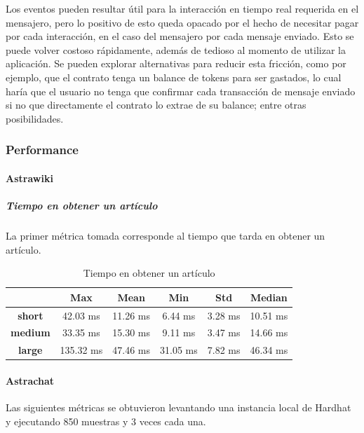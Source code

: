 Los eventos pueden resultar útil para la interacción en tiempo real requerida en el mensajero, pero lo positivo de esto queda opacado por el hecho de necesitar pagar por cada interacción, en el caso del mensajero por cada mensaje enviado. Esto se puede volver costoso rápidamente, además de tedioso al momento de utilizar la aplicación. Se pueden explorar alternativas para reducir esta fricción, como por ejemplo, que el contrato tenga un balance de tokens para ser gastados, lo cual haría que el usuario no tenga que confirmar cada transacción de mensaje enviado si no que directamente el contrato lo extrae de su balance; entre otras posibilidades.

\subsubsection{Performance\label{performance-blockchain}}

\paragraph{Astrawiki}

\subparagraph{Tiempo en obtener un artículo}

La primer métrica tomada corresponde al tiempo que tarda en obtener un artículo.

\setlength\tabcolsep{10pt}
\begin{table}[!htbp]
    \centering
    \begin{tabular}{|c|c|c|c|c|c|}
    \hline
    & \textbf{Max} & \textbf{Mean} & \textbf{Min} & \textbf{Std} & \textbf{Median} \\
    \hline
    \textbf{short} & 42.03 ms & 11.26 ms & 6.44 ms & 3.28 ms & 10.51 ms \\
    \hline
    \textbf{medium} & 33.35 ms & 15.30 ms & 9.11 ms & 3.47 ms & 14.66 ms \\
    \hline
    \textbf{large} & 135.32 ms & 47.46 ms & 31.05 ms & 7.82 ms & 46.34 ms \\
    \hline
    \end{tabular}
    \caption{Tiempo en obtener un artículo}
\end{table}

\paragraph{Astrachat}

Las siguientes métricas se obtuvieron levantando una instancia local de Hardhat \cite{hardhat} y ejecutando 850 muestras y 3 veces cada una.


